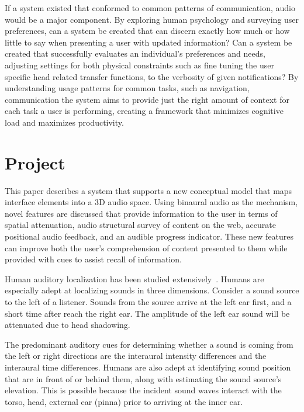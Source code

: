 If a system existed that conformed to common patterns of communication, audio
would be a major component.  By exploring human psychology and surveying user
preferences, can a system be created that can discern exactly how much or how
little to say when presenting a user with updated information? Can a system be
created that successfully evaluates an individual's preferences and needs,
adjusting settings for both physical constraints such as fine tuning the user
specific head related transfer functions, to the verbosity of given
notifications? By understanding usage patterns for common tasks, such as
navigation, communication the system aims to provide just the right amount of
context for each task a user is performing, creating a framework that minimizes
cognitive load and maximizes productivity.


\section{                  Project                                            }


This paper describes a system that supports a new conceptual model that maps
interface elements into a 3D audio space. Using binaural audio as the mechanism,
novel features are discussed that provide information to the user in terms of
spatial attenuation, audio structural survey of content on the web, accurate
positional audio feedback, and an audible progress indicator.  These new
features can improve both the user’s comprehension of content presented to them
while provided with cues to assist recall of information.


Human auditory localization has been studied extensively~\cite{
yost1987directional, blauert1997spatial }. Humans are especially adept at
localizing sounds in three dimensions. Consider a sound source to the left of a
listener.  Sounds from the source arrive at the left ear first, and a short time
after reach the right ear.  The amplitude of the left ear sound will be
attenuated due to head shadowing.


The predominant auditory cues for determining whether a sound is coming from the
left or right directions are the  interaural intensity differences and the
interaural time differences. Humans are also adept at identifying sound position
that are in front of or behind them, along with estimating the sound source's
elevation.  This is possible because the incident sound waves interact with the
torso, head, external ear (pinna) prior to arriving at the inner ear.



